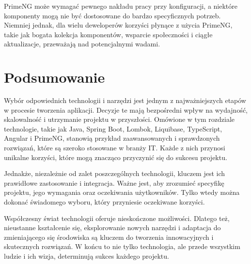 PrimeNG może wymagać pewnego nakładu pracy przy konfiguracji, a niektóre komponenty mogą nie być dostosowane do bardzo specyficznych potrzeb. Niemniej jednak, dla wielu deweloperów korzyści płynące z użycia PrimeNG, takie jak bogata kolekcja komponentów, wsparcie społeczności i ciągłe aktualizacje, przeważają nad potencjalnymi wadami.

\section{Podsumowanie}

Wybór odpowiednich technologii i narzędzi jest jednym z najważniejszych etapów w procesie tworzenia aplikacji. Decyzje te mają bezpośredni wpływ na wydajność, skalowalność i utrzymanie projektu w przyszłości. Omówione w tym rozdziale technologie, takie jak Java, Spring Boot, Lombok, Liquibase, TypeScript, Angular i PrimeNG, stanowią przykład zaawansowanych i sprawdzonych rozwiązań, które są szeroko stosowane w branży IT. Każde z nich przynosi unikalne korzyści, które mogą znacząco przyczynić się do sukcesu projektu.

Jednakże, niezależnie od zalet poszczególnych technologii, kluczem jest ich prawidłowe zastosowanie i integracja. Ważne jest, aby zrozumieć specyfikę projektu, jego wymagania oraz oczekiwania użytkowników. Tylko wtedy można dokonać świadomego wyboru, który przyniesie oczekiwane korzyści.

Współczesny świat technologii oferuje nieskończone możliwości. Dlatego też, nieustanne kształcenie się, eksplorowanie nowych narzędzi i adaptacja do zmieniającego się środowiska są kluczem do tworzenia innowacyjnych i skutecznych rozwiązań. W końcu to nie tylko technologia, ale przede wszystkim ludzie i ich wizja, determinują sukces każdego projektu.